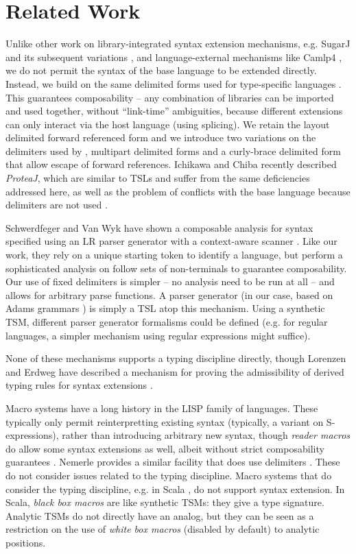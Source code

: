 \documentclass{sig-alternate}[10pt]
\begin{document}
\section{Related Work}\label{related}
Unlike other work on library-integrated syntax extension mechanisms, e.g. SugarJ and its subsequent variations \cite{erdweg2013framework}, and language-external mechanisms like Camlp4 \cite{ocaml-manual}, we do not permit the syntax of the base language to be extended directly. Instead, we build on the same delimited forms used for type-specific languages \cite{TSLs}. This guarantees composability -- any combination of  libraries can be imported and used together, without ``link-time'' ambiguities, because different extensions can only interact via the host language (using splicing). We retain the layout delimited forward referenced form and we introduce two variations on the delimiters used by \cite{TSLs}, multipart delimited forms and a curly-brace delimited form that allow escape of forward references. Ichikawa and Chiba recently described \emph{ProteaJ}, which are similar to TSLs and suffer from the same deficiencies addressed here, as well as the problem of conflicts with the base language because delimiters are not used \cite{Ichikawa:2014:CUO:2577080.2577092}.

Schwerdfeger and Van Wyk have shown a composable analysis for syntax specified using an LR parser generator with a context-aware scanner \cite{conf/pldi/SchwerdfegerW09}. Like our work, they rely on a unique starting token to identify a language, but perform a sophisticated analysis on follow sets of non-terminals to guarantee composability. Our use of fixed delimiters is simpler -- no analysis need to be run at all -- and allows for arbitrary parse functions. A parser generator (in our case, based on Adams grammars \cite{Adams:2013:PPI:2429069.2429129}) is simply a TSL atop this mechanism. Using a synthetic TSM, different parser generator formalisms could be defined (e.g. for regular languages, a simpler mechanism using regular expressions might suffice).

None of these mechanisms supports a typing discipline directly, though Lorenzen and Erdweg have described a mechanism for proving the admissibility of derived typing rules for syntax extensions \cite{conf/icfp/LorenzenE13}.  

Macro systems have a long history in the LISP family of languages. These typically only permit reinterpretting existing syntax (typically, a variant on S-expressions), rather than introducing arbitrary new syntax, though \emph{reader macros} do allow some syntax extensions as well, albeit without strict composability guarantees \cite{steele1990common}. Nemerle provides a similar facility that does use delimiters \cite{skalski2004meta}. These do not consider issues related to the typing discipline. Macro systems that do consider the typing discipline, e.g. in Scala \cite{ScalaMacros2013}, do not support syntax extension. In Scala, \emph{black box macros} are like synthetic TSMs: they give a type signature. Analytic TSMs do not directly have an analog, but they can be seen as a restriction on the use of \emph{white box macros} (disabled by default) to analytic positions. 
\end{document}
